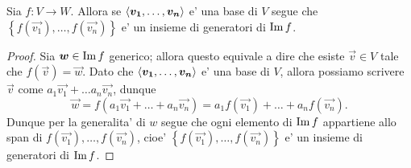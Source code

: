 \begin{proposition}\label{base_mappata_generatori_immagine}
    Sia $f : V \to W$. Allora se $\left\langle \bm{v_1}, \dots, \bm{v_n} \right\rangle$ e' una base di $V$ segue che $\left\{ f(\vec{v_1}), \dots, f(\vec{v_n})\right\}$ e' un insieme di generatori di $\operatorname{Im}f$.
\end{proposition}
\begin{proof}
    Sia $\bm{w} \in \operatorname{Im}f$ generico; allora questo equivale a dire che esiste $\vec{v} \in V$ tale che $f(\vec{v}) = \vec{w}$.
    Dato che $\left\langle \bm{v_1}, \dots, \bm{v_n} \right\rangle$ e' una base di $V$, allora possiamo scrivere $\vec{v}$ come $a_1\vec{v_1} + \dots a_n\vec{v_n}$, dunque 
    \begin{equation*}
        \vec{w} = f(a_1\vec{v_1} + \dots + a_n\vec{v_n}) = a_1f(\vec{v_1}) + \dots + a_nf(\vec{v_n}).
    \end{equation*}
    Dunque per la generalita' di $w$ segue che ogni elemento di $\operatorname{Im}f$ appartiene allo span di $f(\vec{v_1}), \dots, f(\vec{v_n})$, cioe' $\left\{ f(\vec{v_1}), \dots, f(\vec{v_n})\right\}$ e' un insieme di generatori di $\operatorname{Im}f$.
\end{proof}

